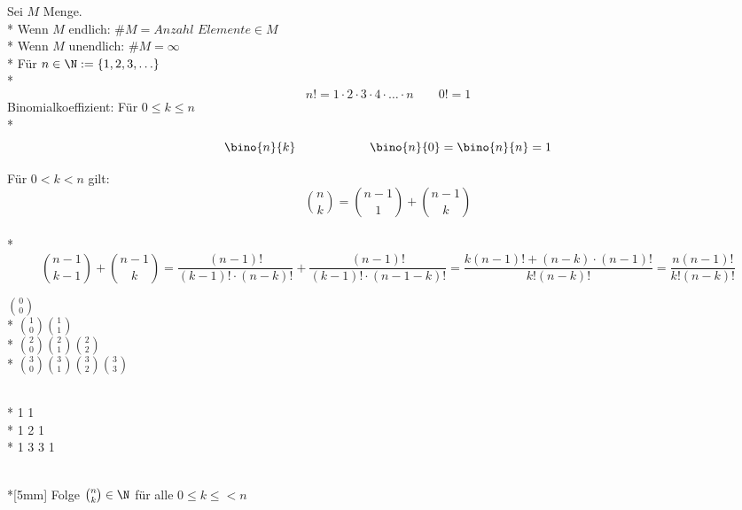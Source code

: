 %
\wdh
Sei $M$ Menge.\\*
Wenn $M$ endlich: $\#M=Anzahl$ $Elemente\in M$\\*
Wenn $M$ unendlich: $\#M=\infty$\\*
Für $n\in \N:=\{1,2,3,\ldots\}$\\*
$$n!=1 · 2 · 3 · 4 · … · n \qquad 0!=1$$
Binomialkoeffizient: Für $0\leq k\leq n$\\*
$$\bino{n}{k} \qquad\qquad\qquad \bino{n}{0}=\bino{n}{n}=1$$

Für $0<k< n$ gilt:
$$\binom{n}{k} = \binom{n -1}{1} + \binom{n-1}{k}$$\\*
%
\bew 
$$\binom{n-1}{k-1}+ \binom{n-1}{k}=\frac{(n-1)!}{(k-1)!·(n-k)!} +\frac{(n-1)!}{(k-1)!·(n-1-k)!} = \frac{k(n-1)!+(n-k)\cdot(n-1)!}{k! (n-k)!}=\frac{n(n-1)!}{k!(n-k)!}$$

\parbox{0.4\textwidth}{\centering
$\binom{0}{0}$\\*
$\binom{1}{0} \binom{1}{1}$\\*
$\binom{2}{0} \binom{2}{1} \binom{2}{2}$\\*
$\binom{3}{0} \binom{3}{1} \binom{3}{2} \binom{3}{3}$}\hfill
\parbox{0.4\textwidth}{\\*
1 1\\*
1 2 1\\*
1 3 3 1}\\*[5mm]
Folge $\binom{n}{k}\in \N$ für alle $0\leq k\leq<n$
%

